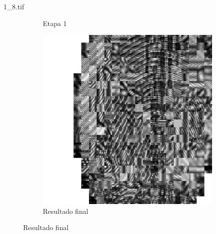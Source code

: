 \documentclass{beamer}
\begin{document}
\begin{frame}{1\_8.tif}
\begin{figure}
\begin{subfigure}[!ht]{0.32\textwidth}
                \caption{Etapa 1}
            \end{subfigure}
            \begin{subfigure}[!ht]{0.32\textwidth}
                \includegraphics[width=\columnwidth]{Fingerprints/1_8_final.jpg}
                \caption{Resultado final}
            \end{subfigure}
        \end{figure}
    \end{frame}

\end{document}
